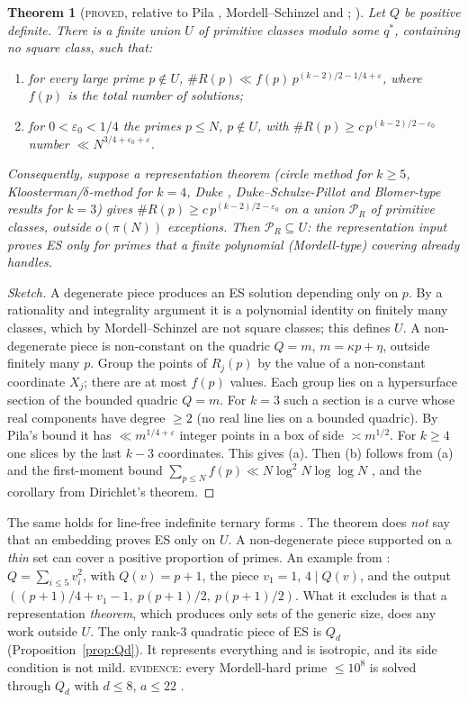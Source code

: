 \documentclass[10pt,reqno]{amsart}
\newtheorem{theorem}{Theorem}[section]
\theoremstyle{definition}
\numberwithin{equation}{section}
\newcommand{\status}[1]{\textup{\textsc{#1}}}
\begin{document}
\begin{theorem}[\status{proved}, relative to Pila \cite{Pi}, Mordell--Schinzel \cite{Mo,Sch} and {\cite[Thm.~1.1]{ET}}; {\cite[Thm.~4.1, Cor.~4.2]{O124}}]\label{thm:ternary}
Let $Q$ be positive definite. There is a finite union $U$ of primitive
classes modulo some $q^*$, containing no square class, such that:
\begin{enumerate}
\item[(a)] for every large prime $p\notin U$,
$\#R(p)\ll f(p)\,p^{(k-2)/2-1/4+\varepsilon}$, where $f(p)$ is the total number
of solutions;
\item[(b)] for $0<\varepsilon_0<1/4$ the primes $p\le N$, $p\notin U$, with
$\#R(p)\ge c\,p^{(k-2)/2-\varepsilon_0}$ number $\ll N^{3/4+\varepsilon_0+\varepsilon}$.
\end{enumerate}
Consequently, suppose a representation theorem (circle method for $k\ge5$,
Kloosterman/$\delta$-method for $k=4$, Duke \cite{Du}, Duke--Schulze-Pillot
\cite{DSP} and Blomer-type results for $k=3$) gives
$\#R(p)\ge c\,p^{(k-2)/2-\varepsilon_0}$ on a union $\mathcal P_R$ of primitive
classes, outside $o(\pi(N))$ exceptions. Then $\mathcal P_R\subseteq U$:
the representation input proves ES only for primes that a finite
polynomial (Mordell-type) covering already handles.
\end{theorem}
\begin{proof}[Sketch]
A degenerate piece produces an ES solution depending only on $p$. By a
rationality and integrality argument it is a polynomial identity on
finitely many classes, which by Mordell--Schinzel are not square classes;
this defines $U$. A non-degenerate piece is non-constant on the quadric
$Q=m$, $m=\kappa p+\eta$, outside finitely many $p$. Group the points of
$R_j(p)$ by the value of a non-constant coordinate $X_j$; there are at
most $f(p)$ values. Each group lies on a hypersurface section of the
bounded quadric $Q=m$. For $k=3$ such a section is a curve whose real
components have degree $\ge2$ (no real line lies on a bounded quadric). By
Pila's bound it has $\ll m^{1/4+\varepsilon}$ integer points in a box of side
$\asymp m^{1/2}$. For $k\ge4$ one slices by the last $k-3$ coordinates. This
gives (a). Then (b) follows from (a) and the first-moment
bound $\sum_{p\le N}f(p)\ll N\log^2N\log\log N$ \cite[Thm.~1.1]{ET}, and the
corollary from Dirichlet's theorem.
\end{proof}
The same holds for line-free indefinite ternary forms \cite[\S5]{O124}. The
theorem does \emph{not} say that an embedding proves ES only on $U$. A
non-degenerate piece supported on a \emph{thin} set can cover a positive
proportion of primes. An example from \cite[\S4]{O124}: $Q=\sum_{i\le5}v_i^2$,
with $Q(v)=p+1$, the piece $v_1=1$, $4\mid Q(v)$, and the output
$((p+1)/4+v_1-1,\ p(p+1)/2,\ p(p+1)/2)$. What it excludes is that a
representation \emph{theorem}, which produces only sets of the generic
size, does any work outside $U$. The only rank-$3$ quadratic piece
of ES is $Q_d$ (Proposition~\ref{prop:Qd}). It represents everything and is
isotropic, and its side condition is not mild. \status{evidence}: every
Mordell-hard prime $\le10^8$ is solved through $Q_d$ with $d\le8$,
$a\le22$ \cite[\S8]{O124}.
\end{document}
